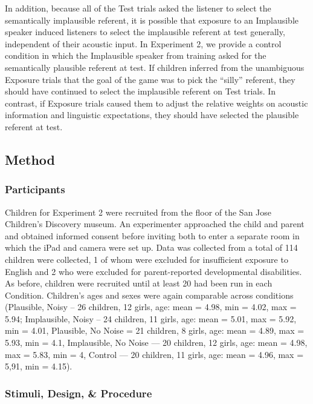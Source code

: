 \documentclass[man,floatsintext]{apa6}
\begin{document}
In addition, because all of the Test trials asked the listener to select the semantically implausible referent, it is possible that exposure to an Implausible speaker induced listeners to select the implausible referent at test generally, independent of their acoustic input.  In Experiment 2, we provide a control condition in which the Implausible speaker from training asked for the semantically plausible referent at test. If children inferred from the unambiguous Exposure trials that the goal of the game was to pick the ``silly'' referent, they should have continued to select the implausible referent on Test trials. In contrast, if Exposure trials caused them to adjust the relative weights on acoustic information and linguistic expectations, they should have selected the plausible referent at test.

\subsection{Method}

\subsubsection{Participants}

Children for Experiment 2 were recruited from the floor of the San Jose Children's Discovery museum. An experimenter approached the child and parent and obtained informed consent before inviting both to enter a separate room in which the iPad and camera were set up. Data was collected from a total of 114 children were collected, 1 of whom were excluded for insufficient exposure to English and 2 who were excluded for parent-reported developmental disabilities. As before, children were recruited until at least 20 had been run in each Condition. Children's ages and sexes were again comparable across conditions (Plausible, Noisy -- 26 children, 12 girls, age: mean = 4.98, min = 4.02, max = 5.94; Implausible, Noisy -- 24 children, 11 girls, age: mean = 5.01, max = 5.92, min = 4.01, Plausible, No Noise = 21 children, 8 girls, age: mean = 4.89, max = 5.93, min = 4.1, Implausible, No Noise --- 20 children, 12 girls, age: mean = 4.98, max = 5.83, min = 4, Control --- 20 children, 11 girls, age: mean = 4.96, max = 5,91, min = 4.15).
 
\subsubsection{Stimuli, Design, \& Procedure}
\end{document}
